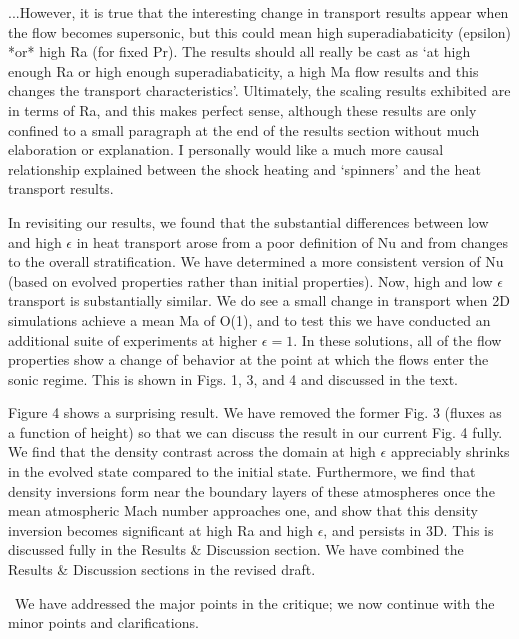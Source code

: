 \documentclass[aps, 11pt, singlecolumn]{revtex4-1} %
\begin{document}
\begin{singlespace}
\begin{myquotation}
...However, it is true that the
interesting change in transport results appear when the flow becomes
supersonic, but this could mean high superadiabaticity (epsilon) *or*
high Ra (for fixed Pr). The results should all really be cast as
`at high enough Ra or high enough superadiabaticity, a high Ma flow
results and this changes the transport characteristics'.
Ultimately, the scaling results exhibited are in terms of Ra, and this
makes perfect sense, although these results are only confined to a
small paragraph at the end of the results section without much
elaboration or explanation. I personally would like a much more causal
relationship explained between the shock heating and `spinners'
and the heat transport results.
\end{myquotation}
In revisiting our results, we found that the substantial differences between
low and high $\epsilon$ in heat transport arose from a poor definition of
Nu and from changes to the overall stratification.  We have determined a
more consistent version of Nu (based on evolved properties rather than initial
properties).  Now, high and low $\epsilon$ transport is substantially similar.
We do see a small change in transport when 2D simulations achieve a mean
Ma of O(1), and to test this we have conducted an additional suite of
experiments at higher $\epsilon = 1$.  In these solutions, all of the flow
properties show a change of behavior at the point at which the flows enter the
sonic regime.  This is shown in Figs. 1, 3, and 4 and discussed in the text.

Figure 4 shows a surprising result.  We have removed the former Fig. 3 (fluxes
as a function of height) so that we can discuss the result in our current
Fig. 4 fully.  We find that the density contrast across the domain at high $\epsilon$
appreciably shrinks in the evolved state compared to the initial state.  Furthermore, we find
that density inversions form near the boundary layers of these atmospheres once the mean atmospheric Mach number approaches
one, and show that this density inversion becomes significant at high Ra and high $\epsilon$,
and persists in 3D.  This is discussed fully in the Results \&
Discussion section.  We have combined the Results \& Discussion sections in the revised draft.


$\,$\newline\noindent
We have addressed the major points in the critique; we now continue with the
minor points and clarifications.


\end{singlespace}
\end{document}
